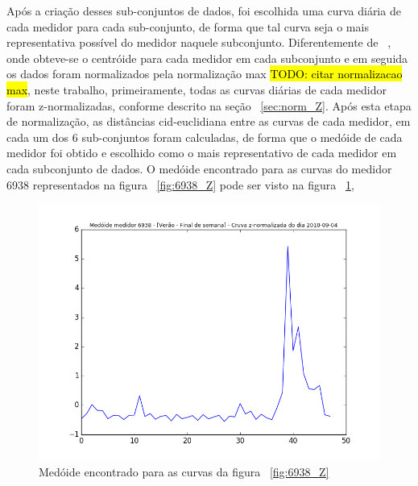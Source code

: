 

Após a criação desses sub-conjuntos de dados, foi escolhida uma curva diária de cada medidor para cada sub-conjunto, de forma que tal curva seja o mais representativa possível do medidor naquele subconjunto. Diferentemente de ~\parencite{Flath2012}, onde obteve-se o centróide para cada medidor em cada subconjunto e em seguida os dados foram normalizados pela normalização max \hl{TODO: citar normalizacao max}, neste trabalho,  primeiramente, todas as curvas diárias de cada medidor foram z-normalizadas, conforme descrito na seção ~\ref{sec:norm_Z}. Após esta etapa de normalização, as distâncias cid-euclidiana entre as curvas de cada medidor, em cada um dos $6$ sub-conjuntos foram calculadas, de forma que o medóide de cada medidor foi obtido e escolhido como o mais representativo de  cada medidor em cada subconjunto de dados. O medóide encontrado para as curvas do medidor 6938 representados na figura ~\ref{fig:6938_Z} pode ser visto na figura ~\ref{fig:6938_medoid},

\begin{figure}[h!]
	\includegraphics[width=\linewidth]{figuras/irish/medoid_6938.png}
	\caption{Medóide encontrado para as curvas da figura ~\ref{fig:6938_Z}}
	\label{fig:6938_medoid}
\end{figure}


